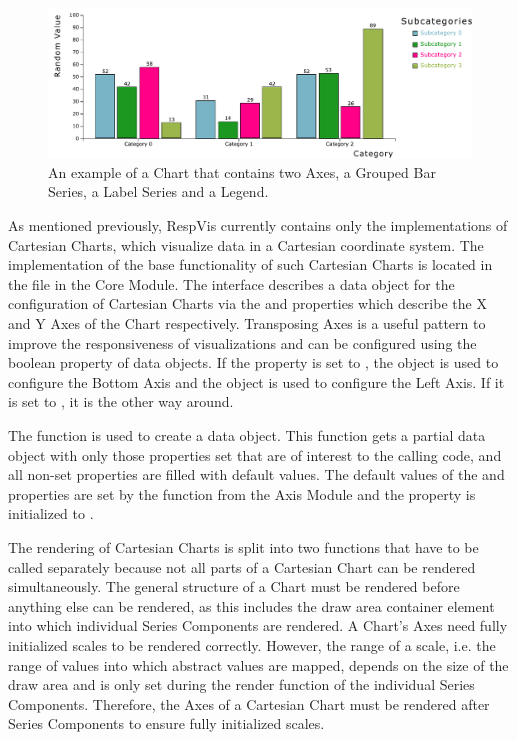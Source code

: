 \begin{figure}[tp]
  \centering
  \includegraphics[keepaspectratio,width=\linewidth,height=\fullh]{diagrams/chart.pdf}
  \caption[Chart Example]{
    An example of a Chart that contains two Axes, a Grouped Bar Series, a Label Series and a Legend.
  }
  \label{fig:Chart}
\end{figure}

As mentioned previously, RespVis currently contains only the implementations of Cartesian Charts, which visualize data in a Cartesian coordinate system.
The implementation of the base functionality of such Cartesian Charts is located in the  file in the Core Module. 
The  interface describes a data object for the configuration of Cartesian Charts via the  and   properties which describe the X and Y Axes of the Chart respectively.
Transposing Axes is a useful pattern to improve the responsiveness of visualizations and can be configured using the  boolean property of  data objects.
If the  property is set to , the  object is used to configure the Bottom Axis and the  object is used to configure the Left Axis. 
If it is set to , it is the other way around.

The  function is used to create a  data object.
This function gets a partial data object with only those properties set that are of interest to the calling code, and all non-set properties are filled with default values.
The default values of the  and  properties are set by the  function from the Axis Module and the  property is initialized to .

The rendering of Cartesian Charts is split into two functions that have to be called separately because not all parts of a Cartesian Chart can be rendered simultaneously.
The general structure of a Chart must be rendered before anything else can be rendered, as this includes the draw area container element into which individual Series Components are rendered.
A Chart's Axes need fully initialized scales to be rendered correctly.
However, the range of a scale, i.e. the range of values into which abstract values are mapped, depends on the size of the draw area and is only set during the render function of the individual Series Components.    
Therefore, the Axes of a Cartesian Chart must be rendered after Series Components to ensure fully initialized scales.

